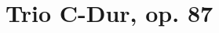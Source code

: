\section*{Trio C-Dur, op. 87}
{%
\parindent 0pt
\noindent
\ifx\preLilyPondExample \undefined
\else
  \expandafter\preLilyPondExample
\fi
\def\lilypondbook{}%

\ifx\postLilyPondExample \undefined
\else
  \expandafter\postLilyPondExample
\fi
}
